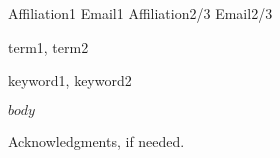 \documentclass[preprint,10pt,numbers]{sigplanconf}
\begin{document}
\setlength{\pdfpageheight}{\paperheight}
\setlength{\pdfpagewidth}{\paperwidth}



\iftoggle{russian-draft}{
\title{Формализация модели простой динамической линковки}
}{
\title{Simple dynamic linking process formalization}
}
\subtitle{Subtitle Text, if any}

           {Affiliation1}
           {Email1}
           {Affiliation2/3}
           {Email2/3}

\maketitle

\begin{abstract}

\end{abstract}


\terms
term1, term2

\keywords
keyword1, keyword2

$body$

\acks

Acknowledgments, if needed.






\end{document}
